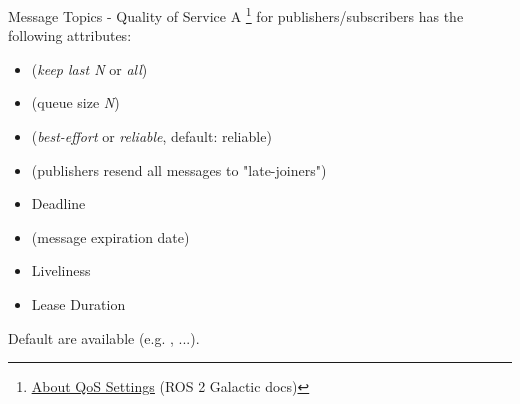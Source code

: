 \begin{frame}{Message Topics - Quality of Service}
A \footnote{\href{https://docs.ros.org/en/galactic/Concepts/About-Quality-of-Service-Settings.html}{\color{blue}\underline{About QoS Settings}} (ROS 2 Galactic docs)} for publishers/subscribers has the following attributes:
\begin{itemize}
  \item {} (\emph{keep last N} or \emph{all})
  \item {} (queue size \emph{N})
  \item {} (\emph{best-effort} or \emph{reliable}, default: reliable)
  \item {} (publishers resend all messages to "late-joiners")
  \item Deadline
  \item {} (message expiration date)
  \item Liveliness
  \item Lease Duration
\end{itemize}
Default  are available (e.g. , ...).
\end{frame}
